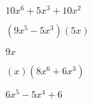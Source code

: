 \documentclass{article}
\begin{document}
\begin{multicols}{2}
 $10x^{6}+5x^{3}+10x^2$\item $(9x^{5}-5x^{3})(5x)$\item $9x$\item $(x)(8x^{6}+6x^{3})$\item $6x^{5}-5x^{4}+6$\item 
\end{multicols}
\end{document}
